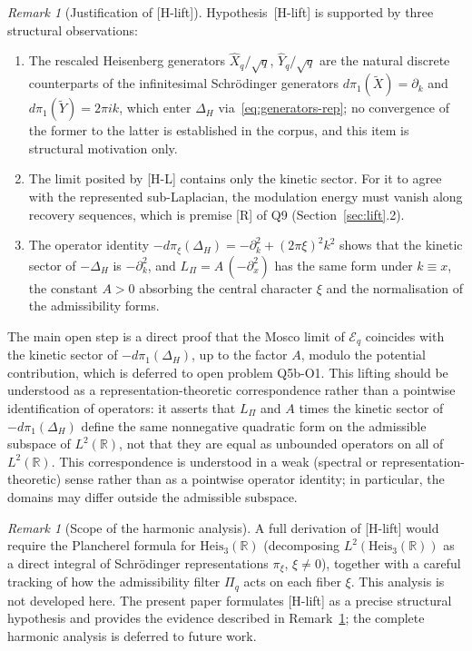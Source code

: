 \documentclass[11pt,a4paper]{article}
\theoremstyle{definition}
\theoremstyle{remark}
\newtheorem{remark}[theorem]{Remark}
\newcommand{\HeisR}{\mathrm{Heis}_3(\mathbb{R})}
\newcommand{\DeltaH}{\Delta_H}
\newcommand{\LPi}{L_\Pi}
\newcommand{\Eq}{\mathcal{E}_q}
\begin{document}
    \begin{remark}[{Justification of [H-lift]}]
      \label{rem:hlift-justification}
      Hypothesis~[H-lift] is supported by three structural observations:
      \begin{enumerate}
        \item The rescaled Heisenberg generators $\hat X_q / \sqrt{q}$, $\hat Y_q / \sqrt{q}$ are the natural
        discrete counterparts of the infinitesimal Schr\"odinger generators $d\pi_1(\tilde X) = \partial_k$ and
        $d\pi_1(\tilde Y) = 2\pi i k$, which enter $\DeltaH$ via~\eqref{eq:generators-rep}; no convergence of the
        former to the latter is established in the corpus, and this item is structural motivation only.
        \item The limit posited by [H-L] contains only the kinetic sector.
        For it to agree with the represented sub-Laplacian, the modulation energy must vanish along recovery
        sequences, which is premise [R] of Q9 (Section~\ref{sec:lift}.2).
        \item The operator identity $-d\pi_\xi(\DeltaH) = -\partial_k^2 + (2\pi\xi)^2 k^2$
        shows that the kinetic sector of $-\DeltaH$ is $-\partial_k^2$, and $\LPi = A\,(-\partial_x^2)$ has the same
        form under $k \equiv x$, the constant $A > 0$ absorbing the central character $\xi$ and the normalisation of
        the admissibility forms.
      \end{enumerate}
      The main open step is a direct proof that the Mosco limit of $\Eq$ coincides with the
      kinetic sector of $-d\pi_1(\DeltaH)$, up to the factor $A$, modulo the potential contribution, which is
      deferred to open problem Q5b-O1.
      This lifting should be understood as a representation-theoretic correspondence
      rather than a pointwise identification of operators: it asserts that
      $\LPi$ and $A$ times the kinetic sector of $-d\pi_1(\DeltaH)$ define the same nonnegative quadratic
      form on the admissible subspace of $L^2(\mathbb{R})$, not that they are equal
      as unbounded operators on all of $L^2(\mathbb{R})$.
      This correspondence is understood in a weak (spectral or representation-theoretic)
      sense rather than as a pointwise operator identity; in particular, the domains
      may differ outside the admissible subspace.
    \end{remark}

    \begin{remark}[Scope of the harmonic analysis]
      \label{rem:harmonic-analysis}
      A full derivation of [H-lift] would require the Plancherel formula for $\HeisR$
      (decomposing $L^2(\HeisR)$ as a direct integral of Schr\"{o}dinger representations
      $\pi_\xi$, $\xi \neq 0$), together with a careful tracking of how the admissibility
      filter $\Pi_q$ acts on each fiber $\xi$.
      This analysis is not developed here.
      The present paper formulates [H-lift] as a precise structural hypothesis and provides
      the evidence described in Remark~\ref{rem:hlift-justification}; the complete harmonic
      analysis is deferred to future work.
    \end{remark}
\end{document}
